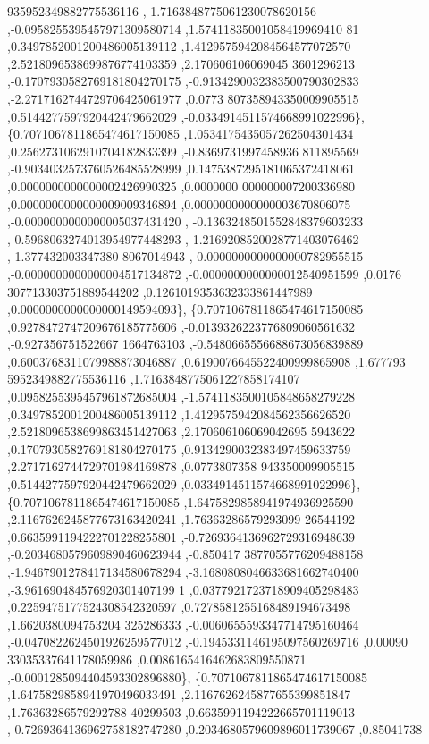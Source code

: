 \begin{DoxyCode}
      935952349882775536116 ,-1.7163848775061230078620156 ,-0.0958255395457971309580714 ,1.57411835001058419969410
      81 ,0.3497852001200486005139112 ,1.4129575942084564577072570 ,2.5218096538699876774103359 ,2.170606106069045
      3601296213 ,-0.1707930582769181804270175 ,-0.9134290032383500790302833 ,-2.2717162744729706425061977 ,0.0773
      807358943350009905515 ,0.5144277597920442479662029 ,-0.0334914511574668991022996\},
\{0.7071067811865474617150085 ,1.0534175435057262504301434 ,0.2562731062910704182833399 ,-0.8369731997458936
      811895569 ,-0.9034032573760526485528999 ,0.1475387295181065372418061 ,0.0000000000000002426990325 ,0.0000000
      000000007200336980 ,0.0000000000000009009346894 ,0.0000000000000003670806075 ,-0.0000000000000005037431420 ,
      -0.1363248501552848379603233 ,-0.5968063274013954977448293 ,-1.2169208520028771403076462 ,-1.377432003347380
      8067014943 ,-0.0000000000000000782955515 ,-0.0000000000000004517134872 ,-0.0000000000000012540951599 ,0.0176
      307713303751889544202 ,0.1261019353632333861447989 ,0.0000000000000000149594093\},
\{0.7071067811865474617150085 ,0.9278472747209676185775606 ,-0.0139326223776809060561632 ,-0.927356751522667
      1664763103 ,-0.5480665556688673056839889 ,0.6003768311079988873046887 ,0.6190076645522400999865908 ,1.677793
      5952349882775536116 ,1.7163848775061227858174107 ,0.0958255395457961872685004 ,-1.5741183500105848658279228 
      ,0.3497852001200486005139112 ,1.4129575942084562356626520 ,2.5218096538699863451427063 ,2.170606106069042695
      5943622 ,0.1707930582769181804270175 ,0.9134290032383497459633759 ,2.2717162744729701984169878 ,0.0773807358
      943350009905515 ,0.5144277597920442479662029 ,0.0334914511574668991022996\},
\{0.7071067811865474617150085 ,1.6475829858941974936925590 ,2.1167626245877673163420241 ,1.76363286579293099
      26544192 ,0.6635991194222701228255801 ,-0.7269364136962729316948639 ,-0.2034680579609890460623944 ,-0.850417
      3877055776209488158 ,-1.9467901278417134580678294 ,-3.1680808046633681662740400 ,-3.961690484576920301407199
      1 ,0.0377921723718909405298483 ,0.2259475177524308542320597 ,0.7278581255168489194673498 ,1.6620380094753204
      325286333 ,-0.0060655593347714795160464 ,-0.0470822624501926259577012 ,-0.1945331146195097560269716 ,0.00090
      33035337641178059986 ,0.0086165416462683809550871 ,-0.0001285094404593302896880\},
\{0.7071067811865474617150085 ,1.6475829858941970496033491 ,2.1167626245877655399851847 ,1.76363286579292788
      40299503 ,0.6635991194222665701119013 ,-0.7269364136962758182747280 ,0.2034680579609896011739067 ,0.85041738

\end{DoxyCode}
